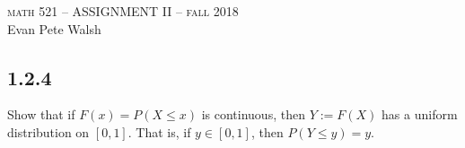 \documentclass[12pt]{article}
\begin{document}
\thispagestyle{empty}
\begin{center}
  \Large \textsc{math 521 -- ASSIGNMENT II -- fall 2018} \\ 
  \vspace{5mm}
  \large Evan Pete Walsh
\end{center}



\subsection*{1.2.4}
\begin{tcolorbox}
  Show that if $F(x) = P(X \leq x)$ is continuous, then $Y := F(X)$ has a uniform distribution on $[0, 1]$. That is, if $y \in [0, 1]$, then $P(Y \leq y) = y$.
\end{tcolorbox}
\end{document}
